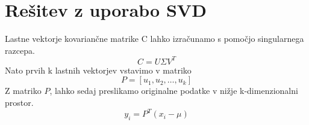 \section{Rešitev z uporabo SVD}
Lastne vektorje kovariančne matrike C lahko izračunamo s pomočjo singularnega razcepa.~\cite{zupan2024uozp}
\begin{equation}
    C = U \Sigma V^T
\end{equation}
Nato prvih k lastnih vektorjev vstavimo v matriko
\begin{equation}
    P = [u_1, u_2, \dots, u_k]
\end{equation}
Z matriko $P$, lahko sedaj preslikamo originalne podatke v nižje k-dimenzionalni prostor. 
\begin{equation}
y_i = P^T (x_i - \mu)
\end{equation}  